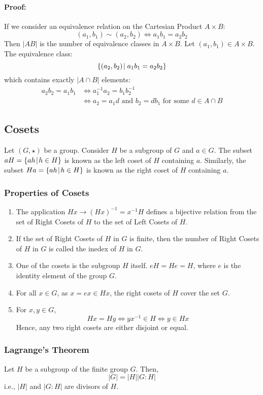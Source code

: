 \documentclass[12pt, oneside]{book}
\begin{document}
\paragraph{Proof:} If we consider an equivalence relation on the Cartesian Product \( A \times B \):
\[ \left( a_1, b_1 \right) \sim \left( a_2, b_2 \right) \Leftrightarrow a_1 b_1 = a_2 b_2 \]
Then \(\left|AB\right|\) is the number of equivalence classes in \(A \times B\).
Let \( \left(a_1, b_1\right) \in A \times B \).
The equivalence class:
\[ \{ \left(a_2, b_2\right) \: \vline \: a_1 b_1 = a_2 b_2 \} \]
which contains exactly \(\left|A \cap B\right|\) elements:
\begin{align*}
    a_2 b_2 = a_1 b_1 &\Leftrightarrow a_1^{-1} a_2 = b_1 b_2^{-1} \\
    &\Leftrightarrow a_2 = a_1 d \text{ and } b_2 = d b_1 \text{ for some } d \in A \cap B
\end{align*} 

\subsection{Cosets}
Let \(\left( G, \star \right) \) be a group.
Consider \(H\) be a subgroup of \(G\) and \(a \in G\).
The subset \(aH = \{ah \: \vline \: h \in H\}\) is known as the left coset of \(H\) containing \(a\).
Similarly, the subset \( Ha = \{ah \: \vline \: h \in H\} \) is known as the right coset of \(H\) containing \(a\).

\subsubsection{Properties of Cosets}
\begin{enumerate}
	\item The application \(Hx \rightarrow \left(Hx \right)^{-1} = x^{-1} H \) defines a bijective relation from the set of Right Cosets of \(H\) to the set of Left Cosets of \(H\).
	\item If the set of Right Cosets of \(H\) in \(G\) is finite, then the number of Right Cosets of \(H\) in \(G\) is called the inedex of \(H\) in \(G\).
	\item One of the cosets is the subgroup \(H\) itself. \(eH = He = H\), where \(e\) is the identity element of the group \(G\).
	\item For all \(x \in G \), as \( x = ex \in Hx \), the right cosets of \(H\) cover the set \(G\).
	\item For \(x,y \in G \),
		\[ Hx = Hy \Leftrightarrow yx^{-1} \in H \Leftrightarrow y \in Hx \]
		Hence, any two right cosets are either disjoint or equal.
\end{enumerate}

\subsubsection{Lagrange's Theorem}
Let \(H\) be a subgroup of the finite group \(G\).
Then,
\[\left|G\right| = \left|H\right|\left|G:H\right| \]
i.e., \(|H|\) and \(|G:H|\) are divisors of \(H\).
\end{document}
